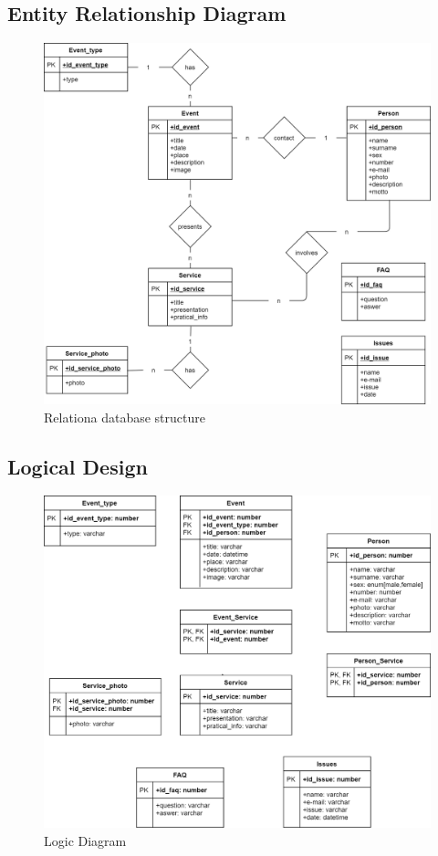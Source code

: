 \subsection{Entity Relationship Diagram}
\begin{figure}[h!]
		\centering
		\begin{minipage}[b]{1\textwidth}
    			\includegraphics[width=\textwidth]{./assets/ER_diagram.png}
			\caption{Relationa database structure}
		\end{minipage}
\end{figure}
\FloatBarrier
\clearpage

\subsection{Logical Design}
\begin{figure}[h!]
		\centering
		\begin{minipage}[b]{1\textwidth}
    			\includegraphics[width=\textwidth]{./assets/logical_diagram.png}
			\caption{Logic Diagram}
		\end{minipage}
\end{figure}
\FloatBarrier